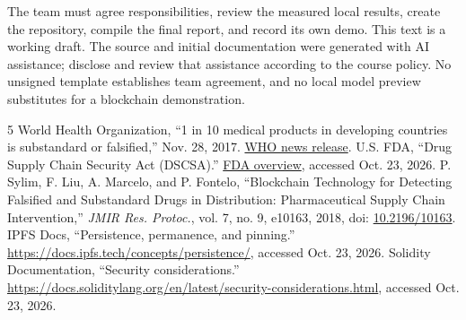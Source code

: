 The team must agree responsibilities, review the measured local results, create the repository, compile the final report, and record its own demo. This text is a working draft. The source and initial documentation were generated with AI assistance; disclose and review that assistance according to the course policy. No unsigned template establishes team agreement, and no local model preview substitutes for a blockchain demonstration.

\begin{thebibliography}{5}\small
{} World Health Organization, ``1 in 10 medical products in developing countries is substandard or falsified,'' Nov. 28, 2017. \href{https://www.who.int/en/news/item/28-11-2017-1-in-10-medical-products-in-developing-countries-is-substandard-or-falsified}{WHO news release}.
 U.S. FDA, ``Drug Supply Chain Security Act (DSCSA).'' \href{https://www.fda.gov/drugs/drug-supply-chain-integrity/drug-supply-chain-security-act-dscsa}{FDA overview}, accessed Oct. 23, 2026.
 P. Sylim, F. Liu, A. Marcelo, and P. Fontelo, ``Blockchain Technology for Detecting Falsified and Substandard Drugs in Distribution: Pharmaceutical Supply Chain Intervention,'' \emph{JMIR Res. Protoc.}, vol. 7, no. 9, e10163, 2018, doi: \href{https://doi.org/10.2196/10163}{10.2196/10163}.
 IPFS Docs, ``Persistence, permanence, and pinning.'' \url{https://docs.ipfs.tech/concepts/persistence/}, accessed Oct. 23, 2026.
 Solidity Documentation, ``Security considerations.'' \url{https://docs.soliditylang.org/en/latest/security-considerations.html}, accessed Oct. 23, 2026.
\end{thebibliography}
